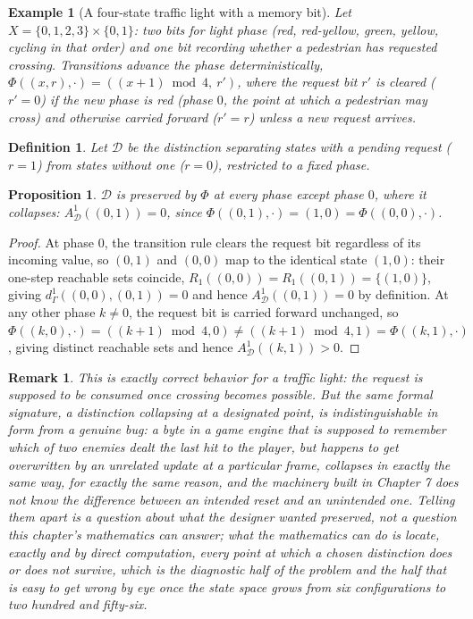 \documentclass[11pt]{report}
\newtheorem{proposition}{Proposition}[chapter]
\newtheorem{definition}{Definition}[chapter]
\newtheorem{remark}{Remark}[chapter]
\newtheorem{example}{Example}[chapter]
\begin{document}
\begin{example}[A four-state traffic light with a memory bit]
Let $X = \{0,1,2,3\} \times \{0,1\}$: two bits for light phase (red,
red-yellow, green, yellow, cycling in that order) and one bit recording
whether a pedestrian has requested crossing. Transitions advance the
phase deterministically, $\Phi((x,r), \cdot) = ((x+1) \bmod 4,\ r')$,
where the request bit $r'$ is cleared ($r' = 0$) if the new phase is
red (phase $0$, the point at which a pedestrian may cross) and
otherwise carried forward ($r' = r$) unless a new request arrives.
\end{example}

\begin{definition}
Let $\mathcal{D}$ be the distinction separating states with a pending
request ($r=1$) from states without one ($r=0$), restricted to a fixed
phase.
\end{definition}

\begin{proposition}
$\mathcal{D}$ is preserved by $\Phi$ at every phase except phase $0$,
where it collapses: $A_{\mathcal D}^1((0,1)) = 0$, since
$\Phi((0,1),\cdot) = (1,0) = \Phi((0,0),\cdot)$.
\end{proposition}
\begin{proof}
At phase $0$, the transition rule clears the request bit regardless of
its incoming value, so $(0,1)$ and $(0,0)$ map to the identical state
$(1,0)$: their one-step reachable sets coincide, $R_1((0,0)) =
R_1((0,1)) = \{(1,0)\}$, giving $d_\Gamma^1((0,0),(0,1)) = 0$ and hence
$A_{\mathcal D}^1((0,1)) = 0$ by definition. At any other phase
$k \neq 0$, the request bit is carried forward unchanged, so
$\Phi((k,0),\cdot) = ((k+1)\bmod 4, 0) \neq ((k+1) \bmod 4, 1) =
\Phi((k,1),\cdot)$, giving distinct reachable sets and hence
$A_{\mathcal D}^1((k,1)) > 0$.
\end{proof}

\begin{remark}
This is exactly correct behavior for a traffic light: the request is
supposed to be consumed once crossing becomes possible. But the same formal signature, a distinction collapsing
at a designated point, is indistinguishable in form from a genuine bug:
a byte in a game engine that is supposed to remember which of two
enemies dealt the last hit to the player, but happens to get
overwritten by an unrelated update at a particular frame, collapses in
exactly the same way, for exactly the same reason, and the machinery
built in Chapter 7 does not know the difference between an intended
reset and an unintended one. Telling them apart is a question about
what the designer wanted preserved, not a question this chapter's
mathematics can answer; what the mathematics can do is locate, exactly
and by direct computation, every point at which a chosen distinction
does or does not survive, which is the diagnostic half of the problem
and the half that is easy to get wrong by eye once the state space
grows from six configurations to two hundred and fifty-six.
\end{remark}
\end{document}

